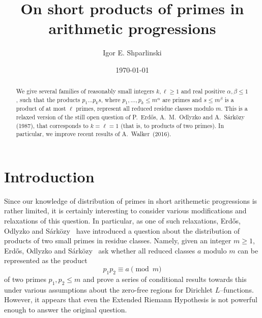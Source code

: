 \documentclass[12pt]{amsart}
\begin{document}
\newtheorem{theorem}{Theorem}
\newtheorem{lemma}[theorem]{Lemma}
\newtheorem{claim}[theorem]{Claim}
\newtheorem{cor}[theorem]{Corollary}
\newtheorem{prop}[theorem]{Proposition}
\newtheorem{definition}{Definition}
\newtheorem{question}[theorem]{Open Question}
\newtheorem{conj}[theorem]{Conjecture}
\newtheorem{prob}{Problem}
\newtheorem{algorithm}[theorem]{Algorithm}


\title[Products of primes  in 
progressions]{On short  products  of primes in arithmetic 
progressions}
\date{\today}

\author{Igor E.  Shparlinski}

\address{Department of Pure Mathematics, University of New South Wales{\cr}
2052 NSW, Australia.}


 

\begin{abstract} We  give  several families of reasonably small integers $k, \ell \ge 1$  
and real positive $\alpha, \beta \le 1$, such that
the products  $p_1\ldots p_k s$, where $p_1, \ldots, p_k \le m^\alpha$ are primes and $s \le m^\beta$ is a product of at most 
$\ell$ primes,  represent all reduced residue classes modulo $m$. 
This is a relaxed version of 
the still open question of P.~Erd{\H o}s, A.~M.~Odlyzko and A.~S{\'a}rk{\"o}zy  (1987), 
that corresponds to $k = \ell =1$ (that is, to products of two primes).  In particular,  we improve 
recent results of A.~Walker~(2016).
\end{abstract}
 
\maketitle

\section{Introduction}

Since our knowledge of distribution of primes in short arithemetic 
progressions is rather limited, it is certainly interesting to consider various 
modifications and relaxations of this question. In particular, as one of such relaxations, 
Erd{\H o}s, Odlyzko and S{\'a}rk{\"o}zy~\cite{EOS}
have introduced a question about the distribution of products 
of two small primes in residue classes.  Namely, given an integer 
$m\ge 1$, Erd{\H o}s, Odlyzko and S{\'a}rk{\"o}zy~\cite{EOS}
ask whether all reduced classes $a$ modulo $m$
can be represented as the product 
\begin{equation}
\label{eq:congr}
p_1p_2\equiv a \pmod m
\end{equation}
 of two primes $p_1,p_2\le m$
and prove   a series of conditional results towards this 
under various assumptions about the zero-free regions for
Dirichlet $L$--functions. However, it appears that even the Extended
Riemann Hypothesis  is  not powerful enough to answer the original 
question.
\end{document}
